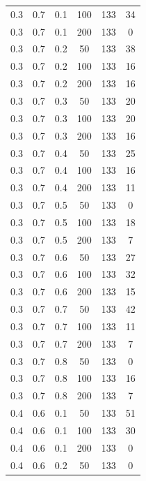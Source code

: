 \documentclass[a4paper,14pt, unknownkeysallowed]{extreport}
\begin{document}
\begin{center}
\begin{longtable}[c]{|c|c|c|c|c|c|}
         0.3 &  0.7 &  0.1 &  100 &   133 &    34 \\
         0.3 &  0.7 &  0.1 &  200 &   133 &     0 \\
        \hline
         0.3 &  0.7 &  0.2 &   50 &   133 &    38 \\
         0.3 &  0.7 &  0.2 &  100 &   133 &    16 \\
         0.3 &  0.7 &  0.2 &  200 &   133 &    16 \\
        \hline
         0.3 &  0.7 &  0.3 &   50 &   133 &    20 \\
         0.3 &  0.7 &  0.3 &  100 &   133 &    20 \\
         0.3 &  0.7 &  0.3 &  200 &   133 &    16 \\
        \hline
         0.3 &  0.7 &  0.4 &   50 &   133 &    25 \\
         0.3 &  0.7 &  0.4 &  100 &   133 &    16 \\
         0.3 &  0.7 &  0.4 &  200 &   133 &    11 \\
        \hline
         0.3 &  0.7 &  0.5 &   50 &   133 &     0 \\
         0.3 &  0.7 &  0.5 &  100 &   133 &    18 \\
         0.3 &  0.7 &  0.5 &  200 &   133 &     7 \\
        \hline
         0.3 &  0.7 &  0.6 &   50 &   133 &    27 \\
         0.3 &  0.7 &  0.6 &  100 &   133 &    32 \\
         0.3 &  0.7 &  0.6 &  200 &   133 &    15 \\
        \hline
         0.3 &  0.7 &  0.7 &   50 &   133 &    42 \\
         0.3 &  0.7 &  0.7 &  100 &   133 &    11 \\
         0.3 &  0.7 &  0.7 &  200 &   133 &     7 \\
        \hline
         0.3 &  0.7 &  0.8 &   50 &   133 &     0 \\
         0.3 &  0.7 &  0.8 &  100 &   133 &    16 \\
         0.3 &  0.7 &  0.8 &  200 &   133 &     7 \\
        \hline
         0.4 &  0.6 &  0.1 &   50 &   133 &    51 \\
         0.4 &  0.6 &  0.1 &  100 &   133 &    30 \\
         0.4 &  0.6 &  0.1 &  200 &   133 &     0 \\
        \hline
         0.4 &  0.6 &  0.2 &   50 &   133 &     0 \\

\end{longtable}
\end{center}
\end{document}
